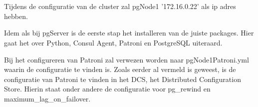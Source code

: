 \section{}
\label{sec:pgNode1}
Tijdens de configuratie van de cluster zal pgNode1 '172.16.0.22' als ip adres hebben.


Idem als bij pgServer is de eerste stap het installeren van de juiste packages. Hier gaat het over Python, Consul Agent, Patroni en PostgreSQL uiteraard.

Bij het configureren van Patroni zal verwezen worden naar pgNode1Patroni.yml waarin de configuratie te vinden is. Zoals eerder al vermeld is geweest, is de configuratie van Patroni te vinden in het DCS, het Distributed Configuration Store. Hierin staat onder andere de configuratie voor pg\_rewind en  maximum\_lag\_on\_failover.

